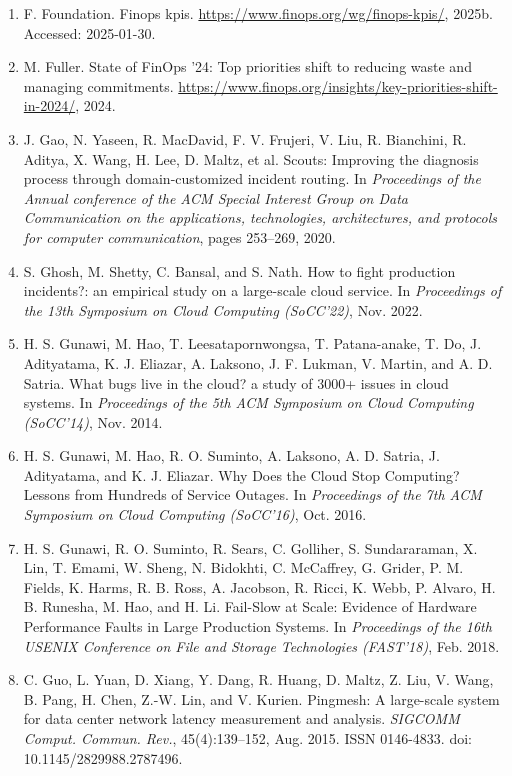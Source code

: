 \documentclass[10pt,UTF8,fontset=fandol]{ctexart}
\begin{document}
\begin{enumerate}[leftmargin=2em,itemsep=2pt]
\item F. Foundation. Finops kpis. \url{https://www.finops.org/wg/finops-kpis/}, 2025b. Accessed: 2025-01-30.

\item M. Fuller. State of FinOps '24: Top priorities shift to reducing waste and managing commitments. \url{https://www.finops.org/insights/key-priorities-shift-in-2024/}, 2024.

\item J. Gao, N. Yaseen, R. MacDavid, F. V. Frujeri, V. Liu, R. Bianchini, R. Aditya, X. Wang, H. Lee, D. Maltz, et al. Scouts: Improving the diagnosis process through domain-customized incident routing. In \textit{Proceedings of the Annual conference of the ACM Special Interest Group on Data Communication on the applications, technologies, architectures, and protocols for computer communication}, pages 253--269, 2020.

\item S. Ghosh, M. Shetty, C. Bansal, and S. Nath. How to fight production incidents?: an empirical study on a large-scale cloud service. In \textit{Proceedings of the 13th Symposium on Cloud Computing (SoCC'22)}, Nov. 2022.

\item H. S. Gunawi, M. Hao, T. Leesatapornwongsa, T. Patana-anake, T. Do, J. Adityatama, K. J. Eliazar, A. Laksono, J. F. Lukman, V. Martin, and A. D. Satria. What bugs live in the cloud? a study of 3000+ issues in cloud systems. In \textit{Proceedings of the 5th ACM Symposium on Cloud Computing (SoCC'14)}, Nov. 2014.

\item H. S. Gunawi, M. Hao, R. O. Suminto, A. Laksono, A. D. Satria, J. Adityatama, and K. J. Eliazar. Why Does the Cloud Stop Computing? Lessons from Hundreds of Service Outages. In \textit{Proceedings of the 7th ACM Symposium on Cloud Computing (SoCC'16)}, Oct. 2016.

\item H. S. Gunawi, R. O. Suminto, R. Sears, C. Golliher, S. Sundararaman, X. Lin, T. Emami, W. Sheng, N. Bidokhti, C. McCaffrey, G. Grider, P. M. Fields, K. Harms, R. B. Ross, A. Jacobson, R. Ricci, K. Webb, P. Alvaro, H. B. Runesha, M. Hao, and H. Li. Fail-Slow at Scale: Evidence of Hardware Performance Faults in Large Production Systems. In \textit{Proceedings of the 16th USENIX Conference on File and Storage Technologies (FAST'18)}, Feb. 2018.

\item C. Guo, L. Yuan, D. Xiang, Y. Dang, R. Huang, D. Maltz, Z. Liu, V. Wang, B. Pang, H. Chen, Z.-W. Lin, and V. Kurien. Pingmesh: A large-scale system for data center network latency measurement and analysis. \textit{SIGCOMM Comput. Commun. Rev.}, 45(4):139--152, Aug. 2015. ISSN 0146-4833. doi: 10.1145/2829988.2787496.


\end{enumerate}
\end{document}
